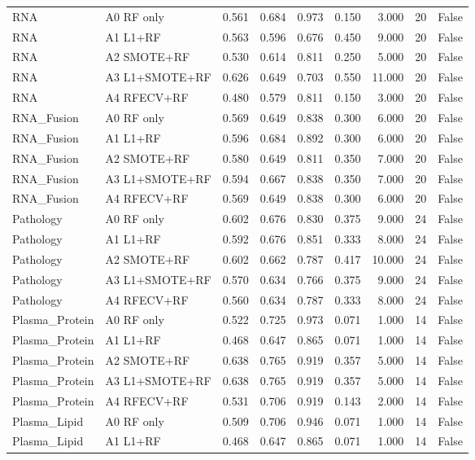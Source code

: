 \begin{table}[t]
\begin{tabular}{llrrrrrrr}
RNA & A0 RF only & 0.561 & 0.684 & 0.973 & 0.150 & 3.000 & 20 & False \\
RNA & A1 L1+RF & 0.563 & 0.596 & 0.676 & 0.450 & 9.000 & 20 & False \\
RNA & A2 SMOTE+RF & 0.530 & 0.614 & 0.811 & 0.250 & 5.000 & 20 & False \\
RNA & A3 L1+SMOTE+RF & 0.626 & 0.649 & 0.703 & 0.550 & 11.000 & 20 & False \\
RNA & A4 RFECV+RF & 0.480 & 0.579 & 0.811 & 0.150 & 3.000 & 20 & False \\
RNA\_Fusion & A0 RF only & 0.569 & 0.649 & 0.838 & 0.300 & 6.000 & 20 & False \\
RNA\_Fusion & A1 L1+RF & 0.596 & 0.684 & 0.892 & 0.300 & 6.000 & 20 & False \\
RNA\_Fusion & A2 SMOTE+RF & 0.580 & 0.649 & 0.811 & 0.350 & 7.000 & 20 & False \\
RNA\_Fusion & A3 L1+SMOTE+RF & 0.594 & 0.667 & 0.838 & 0.350 & 7.000 & 20 & False \\
RNA\_Fusion & A4 RFECV+RF & 0.569 & 0.649 & 0.838 & 0.300 & 6.000 & 20 & False \\
Pathology & A0 RF only & 0.602 & 0.676 & 0.830 & 0.375 & 9.000 & 24 & False \\
Pathology & A1 L1+RF & 0.592 & 0.676 & 0.851 & 0.333 & 8.000 & 24 & False \\
Pathology & A2 SMOTE+RF & 0.602 & 0.662 & 0.787 & 0.417 & 10.000 & 24 & False \\
Pathology & A3 L1+SMOTE+RF & 0.570 & 0.634 & 0.766 & 0.375 & 9.000 & 24 & False \\
Pathology & A4 RFECV+RF & 0.560 & 0.634 & 0.787 & 0.333 & 8.000 & 24 & False \\
Plasma\_Protein & A0 RF only & 0.522 & 0.725 & 0.973 & 0.071 & 1.000 & 14 & False \\
Plasma\_Protein & A1 L1+RF & 0.468 & 0.647 & 0.865 & 0.071 & 1.000 & 14 & False \\
Plasma\_Protein & A2 SMOTE+RF & 0.638 & 0.765 & 0.919 & 0.357 & 5.000 & 14 & False \\
Plasma\_Protein & A3 L1+SMOTE+RF & 0.638 & 0.765 & 0.919 & 0.357 & 5.000 & 14 & False \\
Plasma\_Protein & A4 RFECV+RF & 0.531 & 0.706 & 0.919 & 0.143 & 2.000 & 14 & False \\
Plasma\_Lipid & A0 RF only & 0.509 & 0.706 & 0.946 & 0.071 & 1.000 & 14 & False \\
Plasma\_Lipid & A1 L1+RF & 0.468 & 0.647 & 0.865 & 0.071 & 1.000 & 14 & False \\

\end{tabular}
\end{table}
